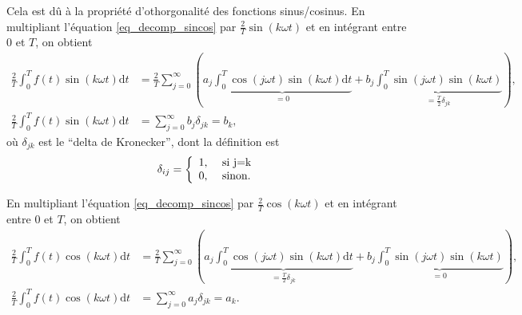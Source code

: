 \documentclass[a4paper,12pt]{book}
\newcommand{\dd}{\mathrm{d}}
\begin{document}
Cela est dû à la propriété d'othorgonalité des fonctions sinus/cosinus.
En multipliant l'équation \eqref{eq_decomp_sincos} par $\frac{2}{T}\sin(k \omega t)$ et en intégrant 
entre $0$ et $T$, on obtient
 \begin{align}
\frac{2}{T}\int_0^T f(t)\sin(k\omega t)\dd t&=\frac{2}{T}\sum_{j=0}^\infty \left(a_j\underbrace{\int_0^T\cos(j\omega t)\sin(k\omega t)\dd t}_{=0}+b_j\underbrace{\int_0^T\sin(j\omega t)\sin(k \omega t)}_{=\frac{T}{2}\delta_{jk}}\right),\nonumber\\
\frac{2}{T}\int_0^T f(t)\sin(k\omega t)\dd t&=\sum_{j=0}^\infty b_j \delta_{jk}=b_k,
\end{align}
où $\delta_{jk}$ est le ``delta de Kronecker'', dont la définition est
\begin{equation}
 \delta_{ij}=\left\{\begin{array}{ll}
                $1,$&$\mbox{ si }j=k$\\
                $0,$&$\mbox{ sinon.}$
               \end{array}\right.
\end{equation}

En multipliant l'équation \eqref{eq_decomp_sincos} par $\frac{2}{T}\cos(k \omega t)$ et en intégrant 
entre $0$ et $T$, on obtient
 \begin{align}
\frac{2}{T}\int_0^T f(t)\cos(k\omega t)\dd t&=\frac{2}{T}\sum_{j=0}^\infty \left(a_j\underbrace{\int_0^T\cos(j\omega t)\sin(k\omega t)\dd t}_{=\frac{T}{2}\delta_{jk}}+b_j\underbrace{\int_0^T\sin(j\omega t)\sin(k \omega t)}_{=0}\right),\nonumber\\
\frac{2}{T}\int_0^T f(t)\cos(k\omega t)\dd t&=\sum_{j=0}^\infty a_j \delta_{jk}=a_k.
\end{align}
\end{document}
